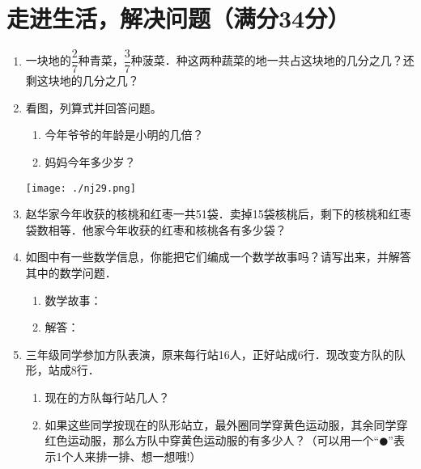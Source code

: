 \documentclass[12pt,twoside,space]{ctexart}
\begin{document}
    \section{走进生活，解决问题（满分34分）}
      \begin{enumerate}[itemsep=1em,topsep=0pt]
        \item 一块地的$\dfrac{2}{7}$种青菜，$\dfrac{3}{7}$种菠菜．种这两种蔬菜的地一共占这块地的几分之几？还剩这块地的几分之几？
        \item 看图，列算式并回答问题。
          \begin{enumerate}[align=left,labelsep=-0.6em,leftmargin=1.2em,noitemsep,topsep=0pt,label={(\arabic*)}]
            \item 今年爷爷的年龄是小明的几倍？
            \item  妈妈今年多少岁？
          \end{enumerate}
          \begin{minipage}{\linewidth}
            \texttt{[image: ./nj29.png]}
          \end{minipage}

        \item 赵华家今年收获的核桃和红枣一共51袋．卖掉15袋核桃后，剩下的核桃和红枣袋数相等．他家今年收获的红枣和核桃各有多少袋？
        \item 如图中有一些数学信息，你能把它们编成一个数学故事吗？请写出来，并解答其中的数学问题．
          \begin{enumerate}[align=left,labelsep=-0.6em,leftmargin=1.2em,noitemsep,topsep=0pt,label={(\arabic*)}]
            \item 数学故事：\underline{\hspace{28em}}
            \item 解答：\underline{\hspace{28em}}
          \end{enumerate}

        \item 三年级同学参加方队表演，原来每行站16人，正好站成6行．现改变方队的队形，站成8行．
          \begin{enumerate}[align=left,labelsep=-0.6em,leftmargin=1.2em,noitemsep,topsep=0pt,label={(\arabic*)}]
            \item 现在的方队每行站几人？
            \item  如果这些同学按现在的队形站立，最外圈同学穿黄色运动服，其余同学穿红色运动服，那么方队中穿黄色运动服的有多少人？（可以用一个“$\CIRCLE$”表示1个人来排一排、想一想哦!）
          \end{enumerate}
      \end{enumerate}
\end{document}
